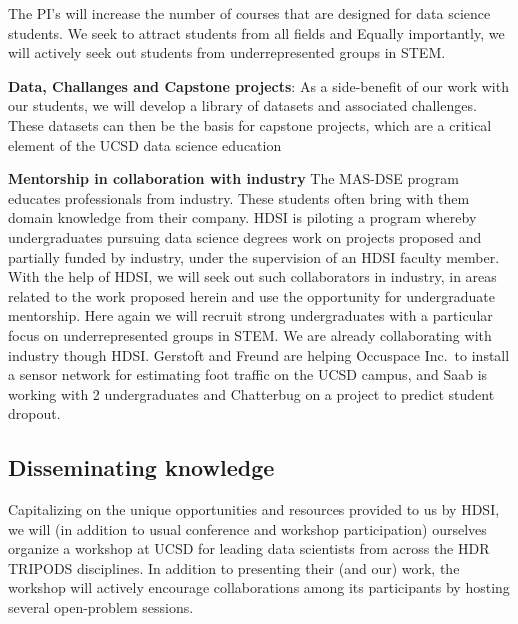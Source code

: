 The PI's will increase the number of courses that are designed for data science students. We seek to attract students from 
all fields and Equally importantly, we will actively seek out students from underrepresented groups in STEM.

{\bf Data, Challanges and Capstone projects}: As a side-benefit of our work with our students, we will develop a library of datasets and associated challenges. These datasets can then be the basis for capstone projects, which are a critical element of the UCSD data science education


{\bf Mentorship in collaboration with industry} The MAS-DSE program educates professionals from industry. These students often bring with them domain knowledge from their company. HDSI is piloting a program whereby undergraduates pursuing data science degrees work on projects proposed and partially funded by industry, under the supervision of an HDSI faculty member. With the help of HDSI, we will seek out such collaborators in industry, in areas related to the work proposed herein and use the opportunity for undergraduate mentorship. Here again we will recruit strong undergraduates with a particular focus on underrepresented groups in STEM. We are already collaborating with industry though HDSI. Gerstoft and Freund are helping Occuspace Inc.\ to install a sensor network for estimating foot traffic on the UCSD campus, and Saab is working with 2 undergraduates and Chatterbug on a project to predict student dropout.

\subsection*{Disseminating knowledge}
Capitalizing on the unique opportunities and resources provided to us by HDSI, we will (in addition to usual conference and workshop participation) ourselves organize a workshop at UCSD for leading data scientists from across the HDR TRIPODS disciplines. In addition to presenting their (and our) work, the workshop will actively encourage collaborations among its participants by hosting several open-problem sessions.
